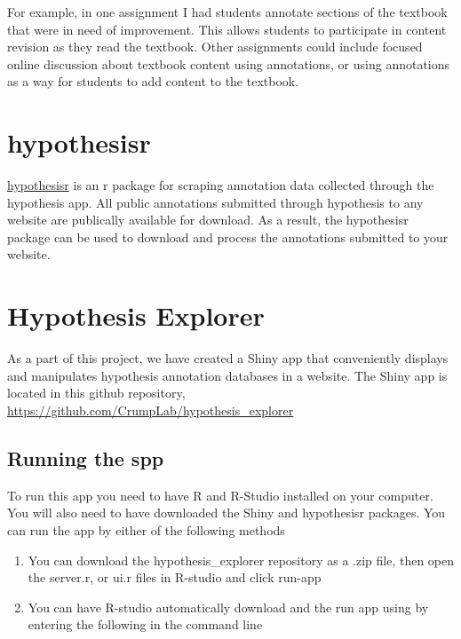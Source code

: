 \documentclass[]{book}
\theoremstyle{definition}
\theoremstyle{definition}
\theoremstyle{definition}
\theoremstyle{remark}
\begin{document}
For example, in one assignment I had students annotate sections of the
textbook that were in need of improvement. This allows students to
participate in content revision as they read the textbook. Other
assignments could include focused online discussion about textbook
content using annotations, or using annotations as a way for students to
add content to the textbook.

\section{hypothesisr}\label{hypothesisr-1}

\href{https://github.com/mdlincoln/hypothesisr}{hypothesisr} is an r
package for scraping annotation data collected through the hypothesis
app. All public annotations submitted through hypothesis to any website
are publically available for download. As a result, the hypothesisr
package can be used to download and process the annotations submitted to
your website.

\section{Hypothesis Explorer}\label{hypothesis-explorer}

As a part of this project, we have created a Shiny app that conveniently
displays and manipulates hypothesis annotation databases in a website.
The Shiny app is located in this github repository,
\url{https://github.com/CrumpLab/hypothesis_explorer}

\subsection{Running the spp}\label{running-the-spp}

To run this app you need to have R and R-Studio installed on your
computer. You will also need to have downloaded the Shiny and
hypothesisr packages. You can run the app by either of the following
methods

\begin{enumerate}
\def\labelenumi{\arabic{enumi}.}
\item
  You can download the hypothesis\_explorer repository as a .zip file,
  then open the server.r, or ui.r files in R-studio and click run-app
\item
  You can have R-studio automatically download and the run app using by
  entering the following in the command line
\end{enumerate}
\end{document}
